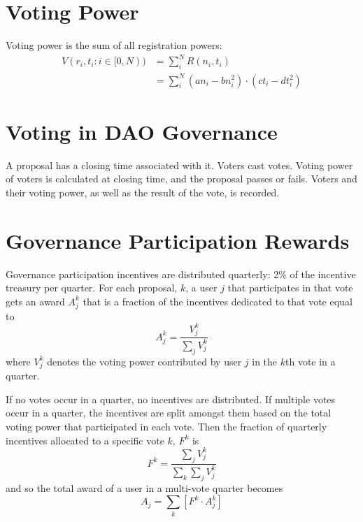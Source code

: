 \documentclass{article}
\begin{document}
\section{Voting Power}\label{sec:votingpower}

Voting power is the sum of all registration powers:
\begin{align}
V(r_i, t_i: i\in[0,N)) &= \sum_i^N R(n_i, t_i)\\
    &= \sum_i^N (an_i - bn_i^2) \cdot (ct_i - dt_i^2)
\end{align}


\section{Voting in DAO Governance}\label{sec:voting}

A proposal has a closing time associated with it.
Voters cast votes.
Voting power of voters is calculated at closing time, and the proposal passes or fails.
Voters and their voting power, as well as the result of the vote, is recorded.

\section{Governance Participation Rewards}\label{sec:rewards}

Governance participation incentives are distributed quarterly: 2\% of the incentive treasury per quarter.
For each proposal, $k$, a user $j$ that participates in that vote gets an award $A^{k}_j$ that is a fraction of the incentives dedicated to that vote equal to
\begin{equation}
A^{k}_j = \frac{V^{k}_j}{\sum_j V^{k}_j}
\end{equation}
where $V^{k}_j$ denotes the voting power contributed by user $j$ in the $k$th vote in a quarter.

If no votes occur in a quarter, no incentives are distributed.
If multiple votes occur in a quarter, the incentives are split amongst them based on the total voting power that participated in each vote.
Then the fraction of quarterly incentives allocated to a specific vote $k$, $F^{k}$ is
\begin{equation}
F^{k} = \frac{\sum_j V^{k}_j}{\sum_k \sum_j V^{k}_j}
\end{equation}
and so the total award of a user in a multi-vote quarter becomes
\begin{equation}
A_j = \sum_k \left[F^{k} \cdot A^{k}_j\right]
\end{equation}
\end{document}
